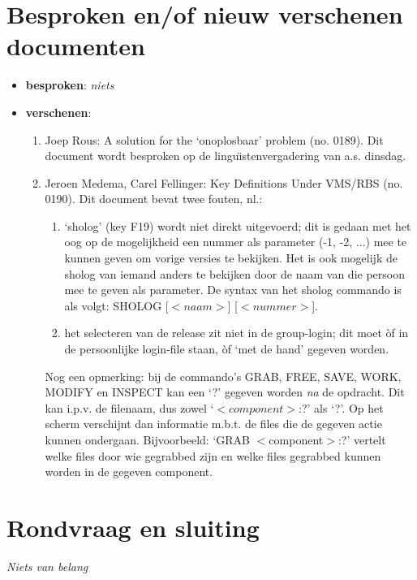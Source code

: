 \section {Besproken en/of nieuw verschenen documenten}

\begin{itemize}
  \item {\bf besproken}: {\em niets}
  \item {\bf verschenen}: 
    \begin{enumerate}
       \item Joep Rous: A solution for the `onoplosbaar' problem (no. 0189). 
             Dit document wordt besproken op de lingu\"{\i}stenvergadering 
             van a.s. dinsdag.
       \item Jeroen Medema, Carel Fellinger: Key Definitions Under VMS/RBS (no. 
             0190). Dit document bevat twee fouten, nl.:
           \begin{enumerate}
              \item `sholog' (key F19) wordt niet direkt uitgevoerd; dit is 
                     gedaan met het oog op de mogelijkheid een nummer
                     als parameter (-1, -2, ...) mee te kunnen geven om
                     vorige versies te bekijken.
                     Het is ook mogelijk de sholog van iemand anders
                     te bekijken door de naam van die persoon mee te geven als 
                     parameter. De syntax van het sholog commando is als volgt:
                     SHOLOG [$<naam>$] [$<nummer>$].
              \item het selecteren van de release zit niet in de group-login; 
                    dit moet  \`{o}f in de persoonlijke login-file staan,       
                    \`{o}f `met de hand' gegeven worden.
              \end{enumerate}
            Nog een opmerking: bij de commando's GRAB, FREE, SAVE, WORK, MODIFY
            en INSPECT kan een `?' gegeven worden {\em na} de opdracht. Dit kan 
            i.p.v. de filenaam, dus zowel `$<component>$:?' als `?'. 
            Op het scherm 
            verschijnt dan informatie m.b.t. de files die de gegeven actie 
            kunnen ondergaan. Bijvoorbeeld: `GRAB $<$component$>$:?'
            vertelt welke files door wie gegrabbed zijn en welke files  
            gegrabbed kunnen worden in de gegeven component.
    \end{enumerate}
\end{itemize}

\section {Rondvraag en sluiting}
{\em Niets van belang}

